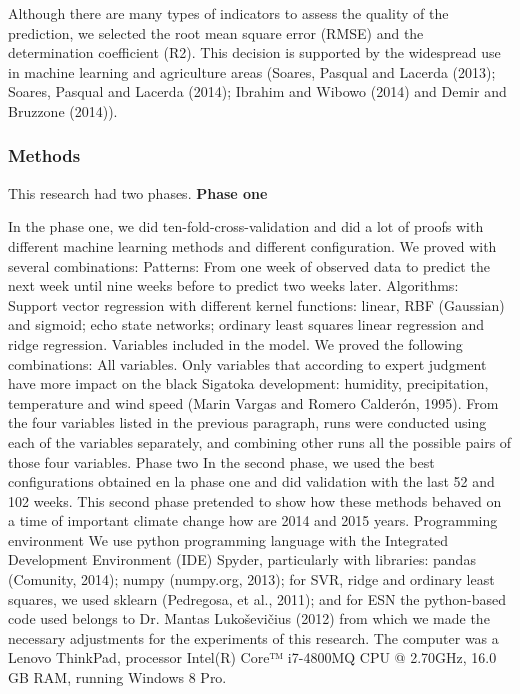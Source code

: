 \documentclass[review]{elsarticle}
\begin{document}
{{Although there are many types of indicators to assess the quality of the prediction, we selected the root mean square error (RMSE) and the determination coefficient (R2).  This decision is supported by the widespread use in machine learning and agriculture areas (Soares, Pasqual and Lacerda (2013); Soares, Pasqual and Lacerda (2014); Ibrahim and Wibowo (2014) and Demir and Bruzzone (2014)).  

\subsubsection{Methods}
This research had two phases.
{\bf Phase one } 

In the phase one, we did ten-fold-cross-validation and did a lot of proofs with different machine learning methods and different configuration. 
We proved with several combinations:
	Patterns: From one week of observed data to predict the next week until nine weeks before to predict two weeks later.
	Algorithms: Support vector regression with different kernel functions: linear, RBF (Gaussian) and sigmoid; echo state networks; ordinary least squares linear regression and ridge regression.
	Variables included in the model. We proved the following combinations:
	All variables.
	Only variables that according to expert judgment have more impact on the black Sigatoka development: humidity, precipitation, temperature and wind speed (Marin Vargas and Romero Calderón, 1995).
	From the four variables listed in the previous paragraph, runs were conducted using each of the variables separately, and combining other runs all the possible pairs of those four variables.
Phase two
In the second phase, we used the best configurations obtained en la phase one and did validation with the last 52 and 102 weeks. 
This second phase pretended to show how these methods behaved on a time of important climate change how are 2014 and 2015 years.
Programming environment
We use python programming language with the Integrated Development Environment (IDE) Spyder, particularly with libraries: pandas (Comunity, 2014); numpy (numpy.org, 2013); for SVR, ridge and ordinary least squares, we used sklearn (Pedregosa, et al., 2011); and for ESN the python-based code used belongs to Dr. Mantas Lukoševičius (2012) from which we made the necessary adjustments for the experiments of this research. The computer was a Lenovo ThinkPad, processor Intel(R) Core™ i7-4800MQ CPU @ 2.70GHz, 16.0 GB RAM, running Windows 8 Pro.






}}
\end{document}
